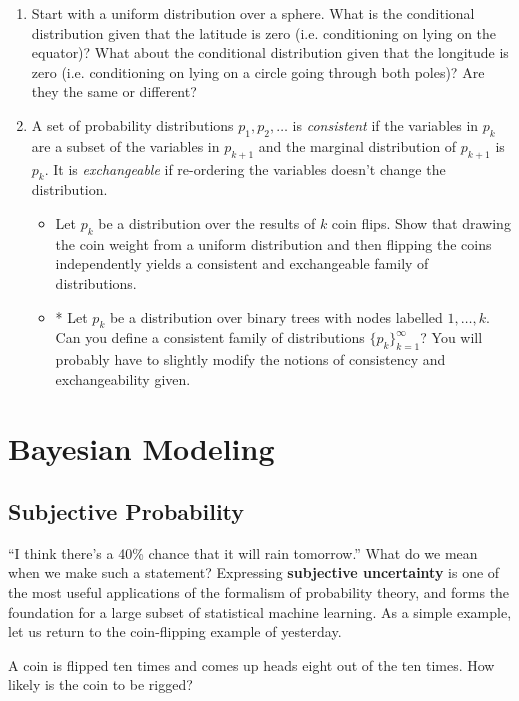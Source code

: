 \documentclass[11pt]{article}
\newenvironment{example}[1][Example]{\begin{trivlist}
\item[\hskip \labelsep {\bfseries #1}]}{\end{trivlist}}
\begin{document}
\begin{enumerate}
\item Start with a uniform distribution over a sphere. What is the conditional distribution given that the latitude is zero (i.e. conditioning on lying on the equator)? What about the conditional distribution given that the longitude is zero (i.e. conditioning on lying on a circle going through both poles)? Are they the same or different?
\item A set of probability distributions $p_1,p_2,\ldots$ is \emph{consistent} if the variables in $p_k$ are a subset of the variables in $p_{k+1}$ and the marginal distribution of $p_{k+1}$ is $p_k$. It is \emph{exchangeable} if re-ordering the variables doesn't change the distribution.
\begin{itemize}
\item Let $p_k$ be a distribution over the results of $k$ coin flips. Show that drawing the coin weight from a uniform distribution and then flipping the coins independently yields a consistent and exchangeable family of distributions.
\item * Let $p_k$ be a distribution over binary trees with nodes labelled $1,\ldots,k$. Can you define a consistent family of distributions $\{p_k\}_{k=1}^{\infty}$? You will probably have to slightly modify the notions of consistency and exchangeability given.
\end{itemize}
\end{enumerate}
\section{Bayesian Modeling}
\subsection{Subjective Probability}
``I think there's a 40\% chance that it will rain tomorrow.'' What do we mean when we make such a statement? Expressing \textbf{subjective uncertainty} is one of the most useful applications of the formalism of probability theory, and forms the foundation for a large subset of statistical machine learning. As a simple example, let us return to the coin-flipping example of yesterday.

\begin{example}
A coin is flipped ten times and comes up heads eight out of the ten times. How likely is the coin to be rigged?
\end{example}
\end{document}
